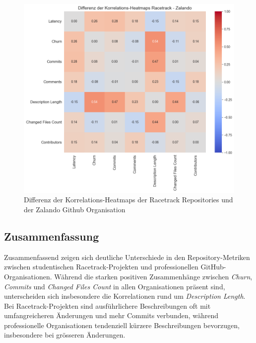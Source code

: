 \begin{figure}[htbp]
\includegraphics[width=\textwidth]{Figures/diff-korrelationsmatrix-racetrack-zalando.png}
\caption{Differenz der Korrelations-Heatmaps der Racetrack Repositories und der Zalando Github Organisation}
\label{fig:diff-korrelationsmatrix-racetrack-zalando}
\end{figure}

\newpage

\subsection{Zusammenfassung}
Zusammenfassend zeigen sich deutliche Unterschiede in den Repository-Metriken zwischen studentischen Racetrack-Projekten und professionellen GitHub-Organisationen. Während die starken positiven Zusammenhänge zwischen \textit{Churn}, \textit{Commits} und \textit{Changed Files Count} in allen Organisationen präsent sind, unterscheiden sich insbesondere die Korrelationen rund um \textit{Description Length}. Bei Racetrack-Projekten sind ausführlichere Beschreibungen oft mit umfangreicheren Änderungen und mehr Commits verbunden, während professionelle Organisationen tendenziell kürzere Beschreibungen bevorzugen, insbesondere bei grösseren Änderungen.

\newpage



